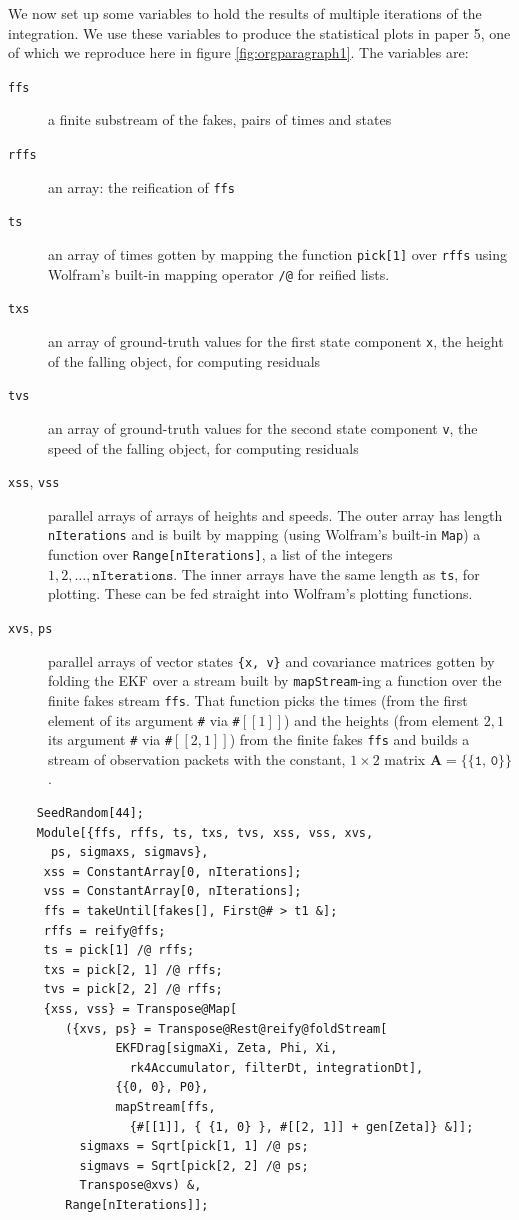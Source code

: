 \documentclass[10pt,oneside,x11names]{article}
\begin{document}
\noindent We now set up some variables to hold the results of multiple
iterations of the integration. We use these variables to produce the statistical
plots in paper 5, one of which we reproduce here in figure
\ref{fig:orgparagraph1}. 
The variables are:
\begin{description}
\item[{\texttt{ffs}}] a finite substream of the fakes, pairs of times and states
\item[{\texttt{rffs}}] an array: the reification of \texttt{ffs}
\item[{\texttt{ts}}] an array of times gotten by mapping the function \texttt{pick[1]} over \texttt{rffs}
     using Wolfram's built-in mapping operator \texttt{/@} for reified lists.
\item[{\texttt{txs}}] an array of ground-truth values for the first state component \texttt{x},
the height of the falling object, for computing residuals
\item[{\texttt{tvs}}] an array of ground-truth values for the second state component \texttt{v},
the speed of the falling object, for computing residuals
\item[{\texttt{xss}, \texttt{vss}}] parallel arrays of arrays of heights and speeds. The outer
array has length \texttt{nIterations} and is built by mapping (using Wolfram's
built-in \texttt{Map}) a function over \texttt{Range[nIterations]}, a
list of the integers \(1, 2, \ldots, \texttt{nIterations}\). The inner arrays have the
same length as \texttt{ts}, for plotting. These can be fed straight into Wolfram's
plotting functions.
\item[{\texttt{xvs}, \texttt{ps}}] parallel arrays of vector states \texttt{\{x, v\}} and covariance
matrices gotten by folding the EKF over a stream built by \texttt{mapStream}-ing a
function over the finite fakes stream \texttt{ffs}. That function picks the times
(from the first element of its argument \texttt{\#} via
\texttt{\#}\(\left[\left[1\right]\right]\)) and the heights (from element \(2, 1\) its argument \texttt{\#} via
\texttt{\#}\(\left[\left[2,1\right]\right]\)) from the finite fakes
\texttt{ffs} and builds a stream of observation packets with the constant,
\(1\times{2}\) matrix \(\mathbold{A}=\texttt{\{\{1, 0\}\}}\).
\end{description}

\begin{verbatim}
    SeedRandom[44];
    Module[{ffs, rffs, ts, txs, tvs, xss, vss, xvs,
      ps, sigmaxs, sigmavs},
     xss = ConstantArray[0, nIterations];
     vss = ConstantArray[0, nIterations];
     ffs = takeUntil[fakes[], First@# > t1 &];
     rffs = reify@ffs;
     ts = pick[1] /@ rffs;
     txs = pick[2, 1] /@ rffs;
     tvs = pick[2, 2] /@ rffs;
     {xss, vss} = Transpose@Map[
        ({xvs, ps} = Transpose@Rest@reify@foldStream[
               EKFDrag[sigmaXi, Zeta, Phi, Xi,
                 rk4Accumulator, filterDt, integrationDt],
               {{0, 0}, P0},
               mapStream[ffs,
                 {#[[1]], { {1, 0} }, #[[2, 1]] + gen[Zeta]} &]];
          sigmaxs = Sqrt[pick[1, 1] /@ ps;
          sigmavs = Sqrt[pick[2, 2] /@ ps;
          Transpose@xvs) &,
        Range[nIterations]];
\end{verbatim}
\end{document}

